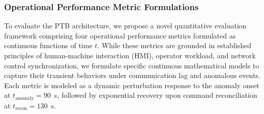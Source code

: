 \documentclass[ASNA,twocolumn]{USG}
\begin{document}
\subsubsection{Operational Performance Metric Formulations}
To evaluate the PTB architecture, we propose a novel quantitative evaluation framework comprising four operational performance metrics formulated as continuous functions of time \(t\). While these metrics are grounded in established principles of human-machine interaction (HMI), operator workload, and network control synchronization, we formulate specific continuous mathematical models to capture their transient behaviors under communication lag and anomalous events. Each metric is modeled as a dynamic perturbation response to the anomaly onset at \(t_\text{anomaly} = 90\)~s, followed by exponential recovery upon command reconciliation at \(t_\text{recon} = 130\)~s.
\end{document}
